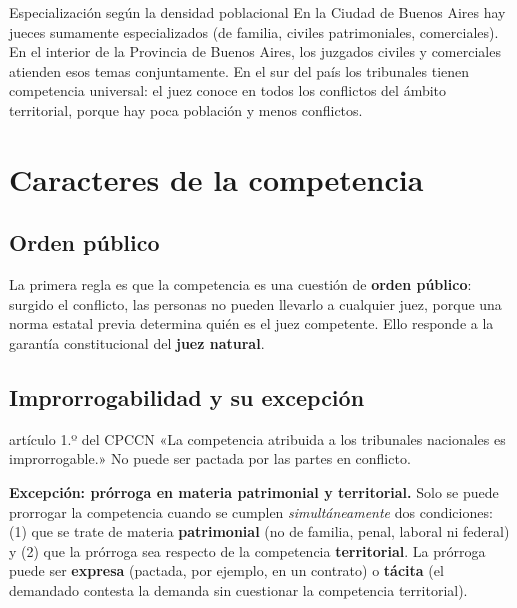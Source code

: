 \documentclass[12pt,oneside]{book}
\begin{document}
\begin{example}{Especialización según la densidad poblacional}
En la Ciudad de Buenos Aires hay jueces sumamente especializados (de familia, civiles patrimoniales, comerciales). En el interior de la Provincia de Buenos Aires, los juzgados civiles y comerciales atienden esos temas conjuntamente. En el sur del país los tribunales tienen competencia universal: el juez conoce en todos los conflictos del ámbito territorial, porque hay poca población y menos conflictos.
\end{example}

\section{Caracteres de la competencia}

\subsection{Orden público}

La primera regla es que la competencia es una cuestión de \textbf{orden público}: surgido el conflicto, las personas no pueden llevarlo a cualquier juez, porque una norma estatal previa determina quién es el juez competente. Ello responde a la garantía constitucional del \textbf{juez natural}.

\subsection{Improrrogabilidad y su excepción}

\begin{norma}{artículo 1.º del CPCCN}
«La competencia atribuida a los tribunales nacionales es improrrogable.» No puede ser pactada por las partes en conflicto.
\end{norma}

\begin{important}
\textbf{Excepción: prórroga en materia patrimonial y territorial.} Solo se puede prorrogar la competencia cuando se cumplen \emph{simultáneamente} dos condiciones: (1) que se trate de materia \textbf{patrimonial} (no de familia, penal, laboral ni federal) y (2) que la prórroga sea respecto de la competencia \textbf{territorial}. La prórroga puede ser \textbf{expresa} (pactada, por ejemplo, en un contrato) o \textbf{tácita} (el demandado contesta la demanda sin cuestionar la competencia territorial).
\end{important}
\end{document}
